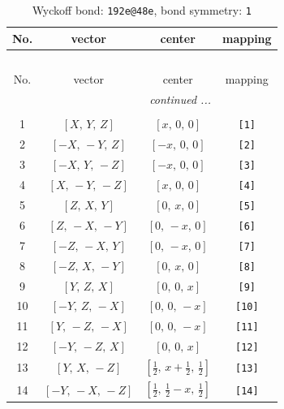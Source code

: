\documentclass[fleqn,8pt]{jsarticle}
\begin{document}
\begin{longtable}{cccc}
\caption{Wyckoff bond: {\tt 192e@48e}, bond symmetry: {\tt 1}}
 \\
 \hline \hline
No. & vector & center & mapping \\ \hline \endfirsthead

\multicolumn{3}{l}{\tablename\ \thetable{}} \\
 \hline \hline
No. & vector & center & mapping \\ \hline \endhead

 \hline \hline
\multicolumn{3}{r}{\footnotesize\it continued ...} \\ \endfoot

 \hline \hline
\multicolumn{3}{r}{} \\ \endlastfoot

1 & $\left[ X,\, Y,\, Z \right]$ & $\left[ x,\, 0,\, 0 \right]$ & {\tt [1]} \\ \hline
2 & $\left[ - X,\, - Y,\, Z \right]$ & $\left[ - x,\, 0,\, 0 \right]$ & {\tt [2]} \\ \hline
3 & $\left[ - X,\, Y,\, - Z \right]$ & $\left[ - x,\, 0,\, 0 \right]$ & {\tt [3]} \\ \hline
4 & $\left[ X,\, - Y,\, - Z \right]$ & $\left[ x,\, 0,\, 0 \right]$ & {\tt [4]} \\ \hline
5 & $\left[ Z,\, X,\, Y \right]$ & $\left[ 0,\, x,\, 0 \right]$ & {\tt [5]} \\ \hline
6 & $\left[ Z,\, - X,\, - Y \right]$ & $\left[ 0,\, - x,\, 0 \right]$ & {\tt [6]} \\ \hline
7 & $\left[ - Z,\, - X,\, Y \right]$ & $\left[ 0,\, - x,\, 0 \right]$ & {\tt [7]} \\ \hline
8 & $\left[ - Z,\, X,\, - Y \right]$ & $\left[ 0,\, x,\, 0 \right]$ & {\tt [8]} \\ \hline
9 & $\left[ Y,\, Z,\, X \right]$ & $\left[ 0,\, 0,\, x \right]$ & {\tt [9]} \\ \hline
10 & $\left[ - Y,\, Z,\, - X \right]$ & $\left[ 0,\, 0,\, - x \right]$ & {\tt [10]} \\ \hline
11 & $\left[ Y,\, - Z,\, - X \right]$ & $\left[ 0,\, 0,\, - x \right]$ & {\tt [11]} \\ \hline
12 & $\left[ - Y,\, - Z,\, X \right]$ & $\left[ 0,\, 0,\, x \right]$ & {\tt [12]} \\ \hline
13 & $\left[ Y,\, X,\, - Z \right]$ & $\left[ \frac{1}{2},\, x + \frac{1}{2},\, \frac{1}{2} \right]$ & {\tt [13]} \\ \hline
14 & $\left[ - Y,\, - X,\, - Z \right]$ & $\left[ \frac{1}{2},\, \frac{1}{2} - x,\, \frac{1}{2} \right]$ & {\tt [14]} \\ \hline

\end{longtable}
\end{document}
